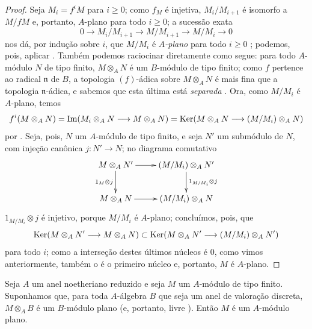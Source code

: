 \begin{proof}
Seja $M_i=f^iM$ para $i\geq0$;
como $f_M$ é injetiva, $M_i/M_{i+1}$ é isomorfo a $M/fM$ e, portanto, $A$-plano para todo $i\geq0$;
a sucessão exata
\[
  0\to M_i/M_{i+1}\to M/M_{i+1}\to M/M_i\to 0
\]
nos dá, por indução sobre $i$, que $M/M_i$ é \emph{$A$-plano} para todo $i\geq0$ ;
podemos, pois, aplicar .
Também podemos raciocinar diretamente como segue:
para todo $A$-módulo $N$ de tipo finito, $M\otimes_A N$ é um $B$-módulo de tipo finito;
como $f$ pertence ao radical $\mathfrak{n}$ de $B$, a topologia $(f)$-ádica sobre $M\otimes_A N$ é mais fina que a topologia
$\mathfrak{n}$-ádica, e sabemos que esta última está \emph{separada} .
Ora, como $M/M_i$ é $A$-plano, temos
\[
  f^i(M\otimes_A N)=\Im(M_i\otimes_A N\to M\otimes_A N)=\Ker(M\otimes_A N\to(M/M_i)\otimes_A N)
\]
por .
Seja, pois, $N$ um $A$-módulo de tipo finito, e seja $N'$ um submódulo de $N$, com injeção canônica $j:N'\to N$; no diagrama comutativo
\[
  \xymatrix{
    M\otimes_A N'\ar[r]\ar[d]_{1_M\otimes j} &
    (M/M_i)\otimes_A N'\ar[d]^{1_{M/M_i}\otimes j}\\
    M\otimes_A N\ar[r] &
    (M/M_i)\otimes_A N
  }
\]
$1_{M/M_i}\otimes j$ é injetivo, porque $M/M_i$ é $A$-plano; concluímos, pois, que
\[
  \Ker(M\otimes_A N'\to M\otimes_A N)\subset\Ker(M\otimes_A N'\to(M/M_i)\otimes_A N')
\]
para todo $i$; como a interseção destes últimos núcleos é $0$, como vimos anteriormente, também o é o primeiro núcleo e, portanto, $M$ é $A$-plano.
\end{proof}

\begin{proposition}[10.2.8]
\label{0.10.2.8}
Seja $A$ um anel noetheriano reduzido e seja $M$ um $A$-módulo de tipo finito.
Suponhamos que, para toda $A$-álgebra $B$ que seja um anel de valoração discreta, $M\otimes_A B$ é um $B$-módulo plano (e, portanto, livre ).
Então $M$ é um $A$-módulo plano.
\end{proposition}

